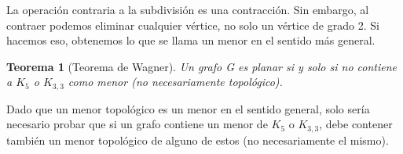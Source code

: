 \documentclass[a4paper,1pt]{report}
\newtheorem*{teo}{Teorema}
\begin{document}
La operación contraria a la subdivisión es una contracción. Sin embargo, al contraer podemos eliminar cualquier vértice, no
solo un vértice de grado 2. Si hacemos eso, obtenemos lo que se llama un menor en el sentido más general.

\begin{teo}[Teorema de Wagner]
 Un grafo G es planar si y solo si no contiene a $K_5$ o  $K_{3,3}$  como menor (no necesariamente topológico). 
\end{teo}

Dado que un menor topológico es un menor en el sentido general, solo sería necesario probar que si un grafo contiene un menor de $K_5$ o  $K_{3,3}$, debe contener también un menor topológico de alguno de estos (no necesariamente el mismo).
\end{document}
